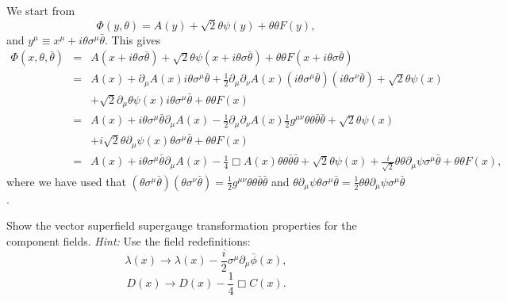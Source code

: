 \documentclass[notes.tex]{subfiles}
\begin{document}
\begin{Answer}
We start from
\begin{equation*}
\Phi(y, \theta) = A(y) + \sqrt{2}\theta\psi(y) + \theta\theta F(y),
\end{equation*}
and $y^\mu \equiv x^\mu + i\theta\sigma^\mu \bar{\theta}$. This gives
\begin{eqnarray*}
\Phi(x, \theta, \bar\theta) &=& A(x + i\theta\sigma\bar{\theta}) + \sqrt{2}\theta\psi(x + i\theta\sigma\bar{\theta}) + \theta\theta F(x + i\theta\sigma \bar{\theta}) \\
&=& A(x) + \partial_\mu A(x)i\theta\sigma^\mu \bar{\theta} + \frac{1}{2}\partial_\mu\partial_\nu A(x)(i\theta\sigma^\mu \bar{\theta})(i\theta\sigma^\nu \bar{\theta})+ \sqrt{2}\theta\psi(x) \\
&&+ \sqrt{2}\partial_\mu\theta\psi(x)i\theta\sigma^\mu \bar{\theta} + \theta\theta F(x) \\
&=& A(x) + i\theta\sigma^\mu \bar{\theta}\partial_\mu A(x) - \frac{1}{2}\partial_\mu\partial_\nu A(x)\frac{1}{2}g^{\mu\nu}\theta\theta\bar\theta\bar\theta+ \sqrt{2}\theta\psi(x) \\
&& + i\sqrt{2}\theta\partial_\mu\psi(x)\theta\sigma^\mu \bar{\theta} + \theta\theta F(x) \\
&=& A(x) + i\theta\sigma^\mu \bar{\theta}\partial_\mu A(x) - \frac{1}{4} \Box A(x)\theta\theta\bar\theta\bar\theta+ \sqrt{2}\theta\psi(x)+\frac{i}{\sqrt{2}}\theta\theta\partial_\mu \psi\sigma^\mu\bar{\theta} + \theta\theta F(x),
\end{eqnarray*}
where we have used that $(\theta\sigma^\mu \bar{\theta})(\theta\sigma^\nu \bar{\theta})=\frac{1}{2}g^{\mu\nu}\theta\theta\bar\theta\bar\theta$ and 
$\theta\partial_\mu\psi\theta\sigma^\mu \bar{\theta}=\frac{1}{2}\theta\theta\partial_\mu \psi\sigma^\mu\bar{\theta}$.
\end{Answer}

\begin{Exercise}
Show the vector superfield supergauge transformation properties for the component fields. {\it Hint:} Use the field redefinitions:
\[\lambda(x) \to \lambda(x) -\frac{i}{2}\sigma^\mu\partial_\mu\bar{\phi}(x),\]
\[D(x) \to D(x) - \frac{1}{4}\Box C(x).\]
\end{Exercise}
\end{document}
